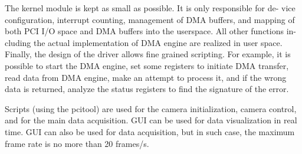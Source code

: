The kernel module is kept as small as possible. It is only responsible for de- vice configuration, interrupt counting, management of DMA buffers, and mapping of both PCI I/O space and DMA buffers into the userspace. All other functions in- cluding the actual implementation of DMA engine are realized in user space. Finally, the design of the driver allows fine grained scripting. For example, it is possible to start the DMA engine, set some registers to initiate DMA transfer, read data from DMA engine, make an attempt to process it, and if the wrong data is returned, analyze the status registers to find the signature of the error.

Scripts (using the pcitool) are used for the camera initialization, camera control, and for the main data acquisition. GUI can be used for data visualization in real time. GUI can also be used for data acquisition, but in such case, the maximum
frame rate is no more than 20 frames/s.



